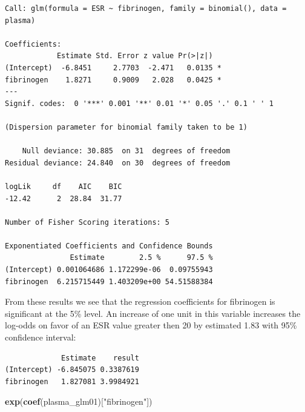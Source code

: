 \documentclass[
]{article}
\newenvironment{Shaded}{\begin{snugshade}}{\end{snugshade}}
\newcommand{\CommentTok}[1]{\textcolor[rgb]{0.56,0.35,0.01}{\textit{#1}}}
\newcommand{\DataTypeTok}[1]{\textcolor[rgb]{0.13,0.29,0.53}{#1}}
\newcommand{\KeywordTok}[1]{\textcolor[rgb]{0.13,0.29,0.53}{\textbf{#1}}}
\newcommand{\NormalTok}[1]{#1}
\newcommand{\StringTok}[1]{\textcolor[rgb]{0.31,0.60,0.02}{#1}}
\begin{document}
\begin{verbatim}
Call: glm(formula = ESR ~ fibrinogen, family = binomial(), data = plasma)

Coefficients:
            Estimate Std. Error z value Pr(>|z|)  
(Intercept)  -6.8451     2.7703  -2.471   0.0135 *
fibrinogen    1.8271     0.9009   2.028   0.0425 *
---
Signif. codes:  0 '***' 0.001 '**' 0.01 '*' 0.05 '.' 0.1 ' ' 1

(Dispersion parameter for binomial family taken to be 1)

    Null deviance: 30.885  on 31  degrees of freedom
Residual deviance: 24.840  on 30  degrees of freedom

logLik     df    AIC    BIC 
-12.42      2  28.84  31.77 

Number of Fisher Scoring iterations: 5

Exponentiated Coefficients and Confidence Bounds
               Estimate        2.5 %      97.5 %
(Intercept) 0.001064686 1.172299e-06  0.09755943
fibrinogen  6.215715449 1.403209e+00 54.51588384
\end{verbatim}

From these results we see that the regression coefficients for
fibrinogen is significant at the 5\% level. An increase of one unit in
this variable increases the log-odds on favor of an ESR value greater
then 20 by estimated 1.83 with 95\% confidence interval:

\begin{Shaded}
\end{Shaded}

\begin{verbatim}
             Estimate    result
(Intercept) -6.845075 0.3387619
fibrinogen   1.827081 3.9984921
\end{verbatim}

\begin{Shaded}
\begin{Highlighting}[]
\KeywordTok{exp}\NormalTok{(}\KeywordTok{coef}\NormalTok{(plasma_glm01)[}\StringTok{"fibrinogen"}\NormalTok{])}
\end{Highlighting}
\end{Shaded}
\end{document}
